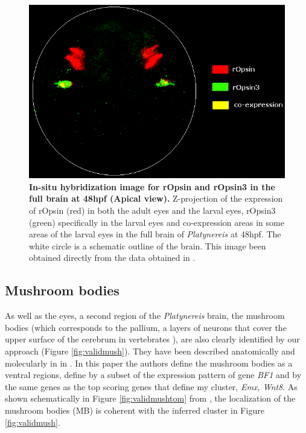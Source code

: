 	
	\begin{figure}[H]
\centerline{\includegraphics[width=1\linewidth]{gfx/chapter6/insitu.png}}
\caption{{\bf In-situ hybridization image for rOpsin and rOpsin3 in the full brain at 48hpf (Apical view).} Z-projection of the expression of rOpsin (red) in both the adult eyes and the larval eyes, rOpsin3 (green) specifically in the larval eyes and co-expression areas in some areas of the larval eyes in the full brain of {\it{Platynereis}} at 48hpf. The white circle is a schematic outline of the brain.  This image been obtained directly from the data obtained in \cite{Tomer10}.}
\label{fig:valideyesinsitu}
	\end{figure}
	
	
		\subsection{Mushroom bodies}
		As well as the eyes, a second region of the {\it{Platynereis}} brain, the mushroom bodies (which corresponds to the pallium, a layers of neurons that cover the upper surface of the cerebrum in vertebrates \cite{Tomer10}), are also clearly identified by our approach (Figure \ref{fig:validmush}). They have been described anatomically and molecularly in \platy{} in \cite{Tomer10}. In this paper the authors define the mushroom bodies as a ventral regions, define by a subset of the expression pattern of gene \emph{BF1} and by the same genes as the top scoring genes that define my cluster, \emph{Emx, Wnt8}. As shown schematically in Figure \ref{fig:validmushtom} from \cite{Tomer10}, the localization of the mushroom bodies (MB) is coherent with the inferred cluster in Figure \ref{fig:validmush}.
		
